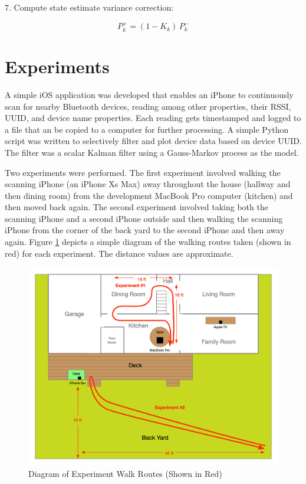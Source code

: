 \documentclass[12pt]{article}
\begin{document}
7. Compute state estimate variance correction:

\begin{equation}
    P_k^+ = (1 - K_k) \, P_k^-
    \label{eq:GM-KF-P-correction}
\end{equation}



%
%

\clearpage
\section{Experiments}

A simple iOS application was developed that enables an iPhone to continuously scan for
nearby Bluetooth devices, reading among other properties, their RSSI, UUID, and device
name properties. Each reading gets timestamped and logged to a file that an be copied to
a computer for further processing. A simple Python script was written to selectively
filter and plot device data based on device UUID. The filter was a scalar Kalman filter
using a Gauss-Markov process as the model.

Two experiments were performed. The first experiment involved walking the scanning
iPhone (an iPhone Xs Max) away throughout the house (hallway and then dining room) from
the development MacBook Pro computer (kitchen) and then moved back again. The second
experiment involved taking both the scanning iPhone and a second iPhone outside and then
walking the scanning iPhone from the corner of the back yard to the second iPhone and then
away again. Figure \ref{fig:experiment-diagram} depicts a simple diagram of the walking
routes taken (shown in red) for each experiment. The distance values are approximate.

\begin{figure}[ht]
    \centering
    \includegraphics[width=1.0\textwidth]{RSSI-Experiment-Routes.png}
    \caption{Diagram of Experiment Walk Routes (Shown in Red)}
    \label{fig:experiment-diagram}
\end{figure}
\end{document}
